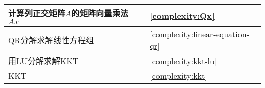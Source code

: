 \begin{center}
\begin{table}[htbp]
\begin{tabular}{|l|l|l|}
        计算列正交矩阵$A$的矩阵向量乘法$Ax$        &    \pageref{complexity:Qx}     &  \cref{complexity:Qx}  \\ \hline
        QR分解求解线性方程组        &    \pageref{complexity:linear-equation-qr} &  \cref{complexity:linear-equation-qr}      \\ \hline
            用LU分解求解KKT    &      \pageref{complexity:kkt-lu}  & \cref{complexity:kkt-lu}    \\ \hline
        KKT        &    \pageref{complexity:kkt} &   \cref{complexity:kkt}     \\ \hline
    \end{tabular}
    \end{table}
\end{center}

